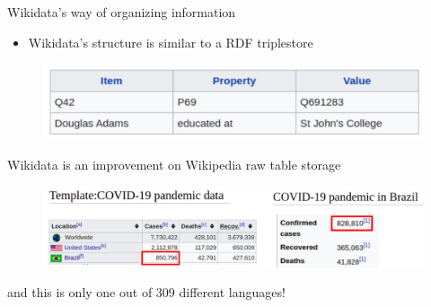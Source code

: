 \documentclass{beamer}
\begin{document}



\begin{frame}{Wikidata's way of organizing information}

\begin{itemize}
    \item Wikidata's structure is similar to a RDF triplestore
\end{itemize}
\begin{figure}
\includegraphics[scale=0.7]{fig/item_property_value.png}
\end{figure}

\end{frame}


\begin{frame}{Wikidata is an improvement on Wikipedia raw table storage}

\begin{figure}
\includegraphics[scale=0.65]{fig/template_covid_19_brasil.png}
\end{figure}
and this is only one out of 309 different languages!
\end{frame}
\end{document}
